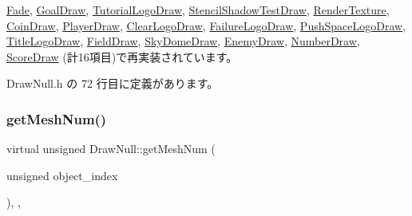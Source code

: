 \mbox{\hyperlink{class_fade_a84a9e688650ac500e03cde74ff0210b8}{Fade}}, \mbox{\hyperlink{class_goal_draw_a554c826d7a4534ee489dfe18edf7ee0e}{Goal\+Draw}}, \mbox{\hyperlink{class_tutorial_logo_draw_aa808cfb8bc59d58bbd698a195603429f}{Tutorial\+Logo\+Draw}}, \mbox{\hyperlink{class_stencil_shadow_test_draw_abb5f9445b7d94c213a3751fa57e36643}{Stencil\+Shadow\+Test\+Draw}}, \mbox{\hyperlink{class_render_texture_a529ab829c676470ae5764b42cba9efb0}{Render\+Texture}}, \mbox{\hyperlink{class_coin_draw_ac7d91fecb6845cebe276eb81a4953563}{Coin\+Draw}}, \mbox{\hyperlink{class_player_draw_a8b9e8caa6bea7295f58a0aaddeb9458b}{Player\+Draw}}, \mbox{\hyperlink{class_clear_logo_draw_ab018f370071f370ae7016d8ee402c456}{Clear\+Logo\+Draw}}, \mbox{\hyperlink{class_failure_logo_draw_a8ee20e1697bbbaf7f41c18334830488a}{Failure\+Logo\+Draw}}, \mbox{\hyperlink{class_push_space_logo_draw_a647dddefc43d66cb3c720ee8fbb6a783}{Push\+Space\+Logo\+Draw}}, \mbox{\hyperlink{class_title_logo_draw_a01e4cb21d580bac86a226fa2e35bf4a3}{Title\+Logo\+Draw}}, \mbox{\hyperlink{class_field_draw_a1915497654d079074dbd3e058db06a78}{Field\+Draw}}, \mbox{\hyperlink{class_sky_dome_draw_a42364ea42618cbab588d55050edfe95a}{Sky\+Dome\+Draw}}, \mbox{\hyperlink{class_enemy_draw_a20a23c1c5fd5e510d15e8ca27aabd821}{Enemy\+Draw}}, \mbox{\hyperlink{class_number_draw_a15e4e602b3f9372349d0b6ff9e4fc423}{Number\+Draw}}, \mbox{\hyperlink{class_score_draw_a799e71943140a264cedba6002308b976}{Score\+Draw}} (計16項目)で再実装されています。



 Draw\+Null.\+h の 72 行目に定義があります。

\mbox{\label{class_draw_null_a7586cc78eed6bcaf2972ad7a6a70e665}} 
\subsubsection{\texorpdfstring{get\+Mesh\+Num()}{getMeshNum()}}
{\footnotesize\ttfamily virtual unsigned Draw\+Null\+::get\+Mesh\+Num (\begin{DoxyParamCaption}\item[{unsigned}]{object\+\_\+index }\end{DoxyParamCaption})\hspace{0.3cm}{\ttfamily [inline]}, {\ttfamily [override]}, {\ttfamily [virtual]}}



